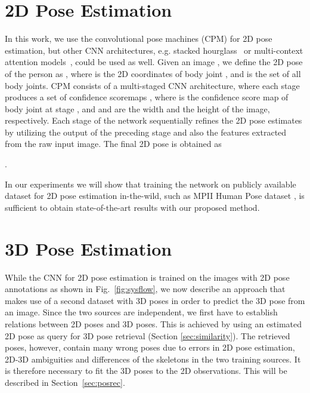 \documentclass[10pt,journal,compsoc]{IEEEtran}
\makeatletter
\newcommand*{\eg}{e.g.\@\xspace}
\makeatother
\begin{document}
\section{2D Pose Estimation}\label{sec:2DPose}
In this work, we use the convolutional pose machines (CPM) \cite{wei2016convolutional} for 2D pose estimation, but other CNN architectures, \eg stacked hourglass~\cite{newell2016eccv} or multi-context attention models~\cite{chu2017CVPRmulti}, could be used as well. Given an image , we define the 2D pose of the person
 as , where  is the 2D coordinates
of body joint , and  is the set of all body joints. CPM consists of a multi-staged
CNN architecture, where each stage  produces a set of confidence scoremaps , 
where   is the confidence score map of body joint  at 
stage , and  and  are the width and the height of the image, respectively. Each stage of the network 
sequentially refines the 2D pose estimates by utilizing the output of the preceding stage and also the features extracted 
from the raw input image. The final 2D pose  is obtained as 

.

In our experiments we will show that training the network on publicly available dataset for 2D pose estimation in-the-wild, 
such as MPII Human Pose dataset \cite{andriluka14cvpr}, is sufficient to obtain state-of-the-art results with our proposed method.

\section{3D Pose Estimation}
While the CNN for 2D pose estimation is trained on the images with 2D pose annotations as shown in Fig.~\ref{fig:sysflow}, 
we now describe an approach that makes use of a second dataset with 3D poses in order to predict the 3D pose from an image. 
Since the two sources are independent, we first have to establish relations between 2D poses and 3D poses.
This is achieved by using an estimated 2D pose as query for 3D pose retrieval (Section \ref{sec:similarity}). 
The retrieved poses, however, contain many wrong poses due to errors in 2D pose estimation, 2D-3D ambiguities
and differences of the skeletons in the two training sources. It is therefore necessary to fit the 3D poses to the 2D observations. 
This will be described in Section~\ref{sec:posrec}.
\end{document}
